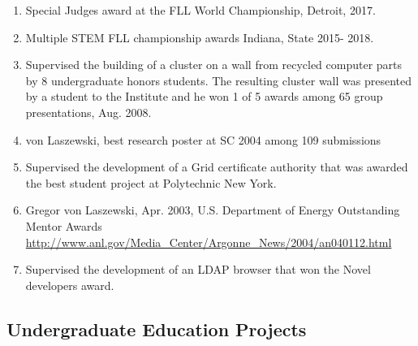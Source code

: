 \documentclass{article}
\begin{document}
\begin{enumerate}
\item  Special Judges award at the FLL World Championship, Detroit, 2017.
\item  Multiple STEM FLL championship awards Indiana, State 2015- 2018.
\item  Supervised the building of a cluster on a wall from recycled computer parts by 8 undergraduate honors students. The resulting cluster wall was presented by a student to the Institute and he won 1 of 5 awards among 65 group presentations, Aug. 2008.
\item  von Laszewski, best research poster at SC 2004 among 109 submissions 
\item  Supervised the development of a Grid certificate authority that was awarded the best student project at Polytechnic New York. 
\item  Gregor von Laszewski, Apr. 2003, U.S. Department of Energy Outstanding Mentor Awards \url{http://www.anl.gov/Media_Center/Argonne_News/2004/an040112.html} 
\item  Supervised the development of an LDAP browser that won the Novel developers award.
\end{enumerate}
 
\subsection{Undergraduate Education Projects}
\end{document}
